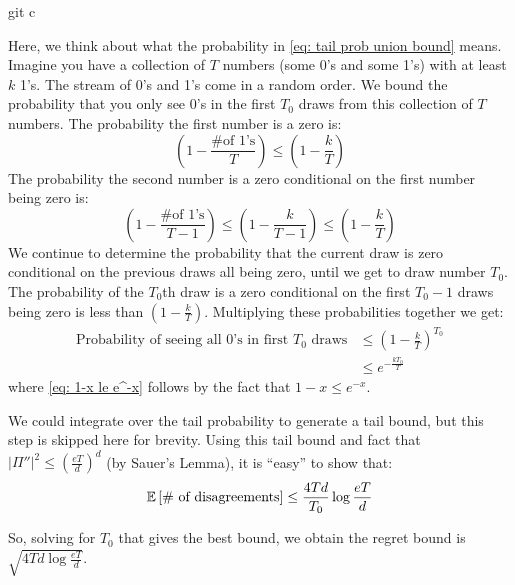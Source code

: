 git c\documentclass[11pt]{article}
\begin{document}
Here, we think about what the probability in \eqref{eq: tail prob union bound} means. Imagine you have a collection of $T$ numbers (some 0's and some 1's) with at least $k$ 1's. The stream of 0's and 1's come in a random order. We bound the probability that you only see 0's in the first $T_0$ draws from this collection of $T$ numbers. The probability the first number is a zero is:
\begin{equation}
(1-\frac{\text{\# of 1's}}{T}) \le (1- \frac{k}{T})
\end{equation}
The probability the second number is a zero conditional on the first number being zero is:
\begin{equation}
(1-\frac{\text{\# of 1's}}{T-1}) \le (1-\frac{k}{T-1}) \le (1 - \frac{k}{T})
\end{equation}
We continue to determine the probability that the current draw is zero conditional on the previous draws all being zero, until we get to draw number $T_0$. The probability of the $T_0${th} draw is a zero conditional on the first $T_0-1$ draws being zero is less than $(1-\frac{k}{T})$. Multiplying these probabilities together we get:
\begin{align}
\text{Probability of seeing all 0's in first } T_0 \text{ draws} &\le (1-\frac{k}{T})^{T_0}\\
&\le e^{-\frac{kT_0}{T}} \label{eq: 1-x le e^-x}
\end{align}
where \eqref{eq: 1-x le e^-x} follows by the fact that $1-x \le e^{-x}$.

We could integrate over the tail probability to generate a tail bound, but this step is skipped here for brevity. Using this tail bound and fact that $|\Pi''|^2 \le (\frac{eT}{d})^d$ (by Sauer's Lemma), it is ``easy'' to show that:
\begin{equation}\label{eq: bound number of disagreements}
\mathbb{E}\left[ \text{\# of disagreements} \right] \le \frac{4Td}{T_0}\log{\frac{eT}{d}}
\end{equation}

So, solving for $T_0$ that gives the best bound, we obtain the regret bound is $\sqrt{4Td\log{\frac{eT}{d}}}$.




\end{document}
